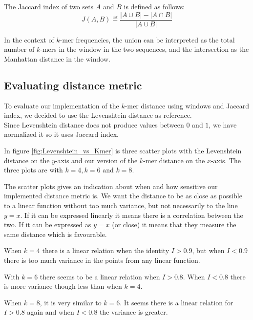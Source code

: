 The Jaccard index of two sets $A$ and $B$ is defined as follows:
\begin{equation}
  J(A, B) \eqdef \frac{|A \cup B| - |A \cap B|}{|A \cup B|}
\end{equation}

In the context of $k$-mer frequencies, the union can be interpreted as the
total number of $k$-mers in the window in the two sequences, and the
intersection as the Manhattan distance in the window.

\subsection{Evaluating distance metric}
To evaluate our implementation of the $k$-mer distance using windows and
Jaccard index, we decided to use the Levenshtein distance as reference.\\ Since
Levenshtein distance does not produce values between $0$ and $1$, we have
normalized it so it uses Jaccard index.

In figure \ref{fig:Levenshtein_vs_Kmer} is three scatter plots with the
Levenshtein distance on the $y$-axis and our version of the $k$-mer distance on
the $x$-axis. The three plots are with $k=4,k=6$ and $k=8$.

The scatter plots gives an indication about when and how sensitive our
implemented distance metric is. We want the distance to be as close as possible
to a linear function without too much variance, but not necessarily to the line
$y=x$. If it can be expressed linearly it means there is a correlation between
the two. If it can be expressed as $y=x$ (or close) it means that they measure
the same distance which is favourable.

When $k=4$ there is a linear relation when the identity $I>0.9$, but when
$I<0.9$ there is too much variance in the points from any linear function.

With $k=6$ there seems to be a linear relation when $I>0.8$. When $I<0.8$ there
is more variance though less than when $k=4$.

When $k=8$, it is very similar to $k=6$. It seems there is a linear relation
for $I>0.8$ again and when $I<0.8$ the variance is greater.

